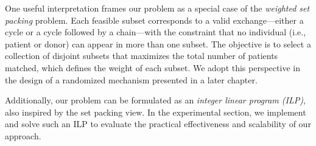 One useful interpretation frames our problem as a special case of the \emph{weighted set packing} problem. Each feasible subset corresponds to a valid exchange—either a cycle or a cycle followed by a chain—with the constraint that no individual (i.e., patient or donor) can appear in more than one subset. The objective is to select a collection of disjoint subsets that maximizes the total number of patients matched, which defines the weight of each subset. We adopt this perspective in the design of a randomized mechanism presented in a later chapter.

Additionally, our problem can be formulated as an \emph{integer linear program (ILP)}, also inspired by the set packing view. In the experimental section, we implement and solve such an ILP to evaluate the practical effectiveness and scalability of our approach.


